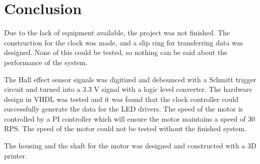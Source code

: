 \section{Conclusion} 
Due to the lack of equipment available, the project was not finished.
The construction for the clock was made, and a slip ring for transferring data was designed.
None of this could be tested, so nothing can be said about the performance of the system.

The Hall effect sensor signals was digitized and debounced with a Schmitt trigger circuit and turned into a 3.3 V signal with a logic level converter.
The hardware design in VHDL was tested and it was found that the clock controller could successfully generate the data for the LED drivers.
The speed of the motor is controlled by a PI controller which will ensure the motor maintains a speed of 30 RPS.
The speed of the motor could not be tested without the finished system.

The housing and the shaft for the motor was designed and constructed with a 3D printer.